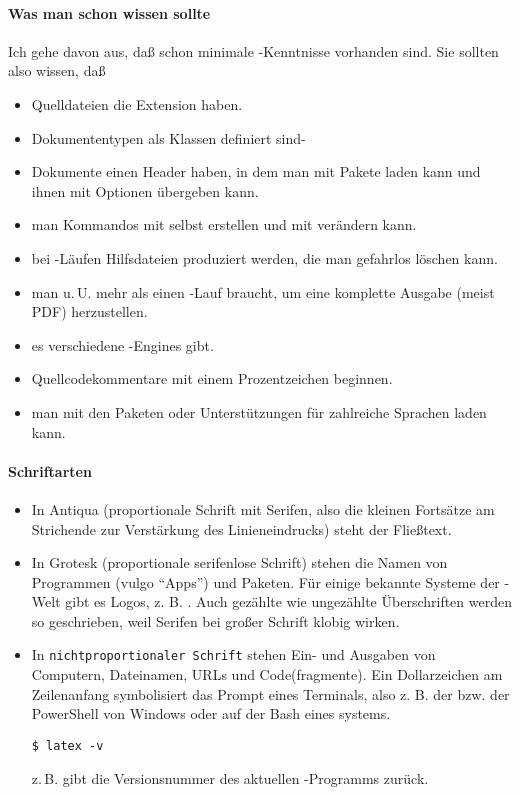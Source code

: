 \documentclass[
	11pt,        %
	table,       %
	twoside,     %
	notitlepage, %
]{scrreprt}
\begin{document}
\paragraph{Was man schon wissen sollte}
Ich gehe davon aus, daß schon minimale \LaTeXi-Kenntnisse vorhanden sind. Sie sollten also wissen, daß \textellipsis
\begin{itemize}
\item \textellipsis Quelldateien die Extension  haben.
\item \textellipsis Dokumententypen als Klassen definiert sind-
\item \textellipsis Dokumente einen Header haben, in dem man mit  Pakete laden kann und ihnen mit \Kbd{[key=value]} Optionen übergeben kann.
\item \textellipsis man Kommandos mit  selbst erstellen und mit  verändern kann.
\item \textellipsis bei \Option-Läufen Hilfsdateien produziert werden, die man gefahrlos löschen kann.
\item \textellipsis man u.\,U. mehr als einen \LaTeXi-Lauf braucht, um eine komplette Ausgabe (meist PDF) herzustellen.
\item \textellipsis es verschiedene \LaTeXi-Engines gibt.
\item \textellipsis Quellcodekommentare mit einem Prozentzeichen beginnen.
\item \textellipsis man mit den Paketen  oder  Unterstützungen für zahlreiche Sprachen laden kann.
\end{itemize}

\paragraph{Schriftarten}
\begin{itemize}
\item In Antiqua (proportionale Schrift mit Serifen, also die kleinen Fortsätze am Strichende zur Verstärkung des Linieneindrucks) steht der Fließtext.
\item In \textsf{Grotesk} (proportionale serifenlose Schrift) stehen die Namen von Programmen (vulgo \enquote{Apps}) und Paketen. Für einige bekannte Systeme der \TeXi-Welt gibt es Logos, z. B. \LaTeXi. Auch gezählte wie ungezählte Überschriften werden so geschrieben, weil Serifen bei großer Schrift klobig wirken.
\item In \texttt{nichtproportionaler Schrift} stehen Ein- und Ausgaben von Computern, Dateinamen, URLs und Code(fragmente). Ein Dollarzeichen am Zeilenanfang symbolisiert das Prompt eines Terminals, also z. B.  der  bzw.  der PowerShell von Windows oder  auf der Bash eines systems.
\begin{lstlisting}
$ latex -v
\end{lstlisting}
z.\,B. gibt die Versionsnummer des aktuellen \LaTeXi-Programms zurück.
\end{itemize}
\end{document}
